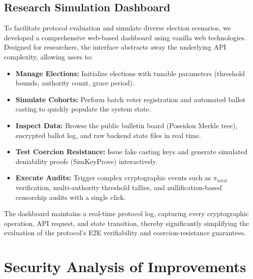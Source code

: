 \documentclass[conference]{IEEEtran}
\begin{document}
\subsection{Research Simulation Dashboard}

To facilitate protocol evaluation and simulate diverse election scenarios, we developed a comprehensive web-based dashboard using vanilla web technologies. Designed for researchers, the interface abstracts away the underlying API complexity, allowing users to:
\begin{itemize}
  \item \textbf{Manage Elections:} Initialize elections with tunable parameters (threshold bounds, authority count, grace period).
  \item \textbf{Simulate Cohorts:} Perform batch voter registration and automated ballot casting to quickly populate the system state.
  \item \textbf{Inspect Data:} Browse the public bulletin board (Poseidon Merkle tree), encrypted ballot log, and raw backend state files in real time.
  \item \textbf{Test Coercion Resistance:} Issue fake casting keys and generate simulated deniability proofs (\textsf{SimKeyProve}) interactively.
  \item \textbf{Execute Audits:} Trigger complex cryptographic events such as $\pi_{\text{total}}$ verification, multi-authority threshold tallies, and nullification-based censorship audits with a single click.
\end{itemize}

The dashboard maintains a real-time protocol log, capturing every cryptographic operation, API request, and state transition, thereby significantly simplifying the evaluation of the protocol's E2E verifiability and coercion-resistance guarantees.


\section{Security Analysis of Improvements}
\label{sec:security}
\end{document}
